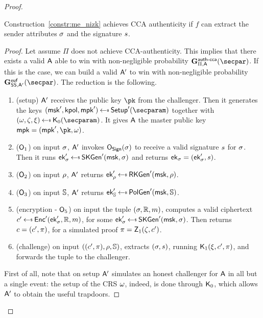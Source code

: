 \begin{proof}
    \begin{lemma}\label{lemma:me_auth}
        Construction~\ref{constr:me_nizk} achieves CCA authenticity if $f$ can extract the sender attributes $\sigma$ and the signature $s$.
        \begin{proof}
            Let assume $\Pi$ does not achieve CCA-authenticity.
            This implies that there exists a valid $\mathsf{A}$ able to win with non-negligible probability $\NISHeufgamecca{}_{\Pi, \adversary}(\secpar)$.
            If this is the case, we can build a valid $\mathsf{A}'$ to win with non-negligible probability $\Sigeufgame_{\sig, \adversary'}(\secpar)$. The reduction is the following.

            \begin{enumerate}
                \item (setup) $\mathsf{A}'$ receives the public key $\pk$ from the challenger. Then it generates the keys $(\msk', \kpol, \mpk') \getsr \setup'(\secparam)$ together with $(\crs,\tpsim,\tpext)\getsr\nizkext_0(\secparam)$. It gives $\mathsf{A}$ the master public key $\mpk = (\mpk', \pk, \crs)$.
                \item ($\mathsf{O}_1$) on input $\sigma$, $\mathsf{A}'$ invokes $\mathsf{O}_{\mathsf{Sign}}(\sigma)$ to receive a valid signature $s$ for $\sigma$. Then it runs $\ek'_\sattr \getsr \skgen'(\msk, \sattr)$ and returns $\mathsf{ek}_\sigma = (\mathsf{ek}_\sigma', s)$.
                \item ($\mathsf{O}_2$) on input $\rho$, $\mathsf{A}'$ returns $\ek'_\rattr \getsr \rkgen'(\msk, \rattr)$.
                \item ($\mathsf{O}_3$) on input $\mathbb{S}$, $\mathsf{A}'$ returns $\ek'_\saccess \getsr \polgen'(\msk, \saccess)$.
                \item (encryption - $\mathsf{O}_5$) on input the tuple $(\sigma, \mathbb{R}, m)$, computes a valid ciphertext $\cipher' \getsr \enc'(\ek'_\sattr, \raccess, \msg)$, for some $\ek'_\sattr \getsr \skgen'(\msk, \sattr)$. Then returns $c = (c', \pi)$, for a simulated proof $\pi = \mathsf{Z}_1(\zeta, c')$.
                \item (challenge) on input $((c', \pi), \rho, \mathbb{S})$, extracts $(\sigma, s)$, running $\mathsf{K}_1(\xi, c', \pi)$, and forwards the tuple to the challenger.
            \end{enumerate}
            First of all, note that on setup $\mathsf{A}'$ simulates an honest challenger for $\mathsf{A}$ in all but a single event: the setup of the CRS $\omega$, indeed, is done through $\mathsf{K}_0$, which allows $\mathsf{A}'$ to obtain the useful trapdoors.

\end{proof}
\end{lemma}
\end{proof}
